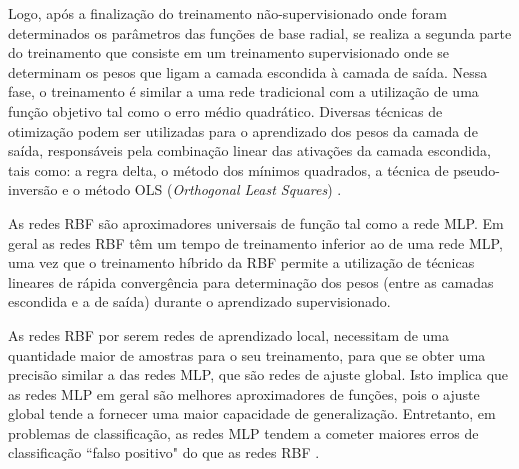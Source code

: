 Logo, após a finalização do treinamento não-supervisionado onde foram determinados os parâmetros das funções de base radial, se realiza a segunda parte do treinamento que consiste em um treinamento supervisionado onde se determinam os pesos que ligam a camada escondida à camada de saída. Nessa fase, o treinamento é similar a uma rede tradicional com a utilização de uma função objetivo tal como o erro médio quadrático. Diversas técnicas de otimização podem ser utilizadas para o aprendizado dos pesos da camada de saída, responsáveis pela combinação linear das ativações da camada escondida, tais como: a regra delta, o método dos mínimos quadrados, a técnica de pseudo-inversão e o método OLS (\textit{Orthogonal Least Squares}) \cite{chen1991orthogonal}.

As redes RBF são aproximadores universais de função tal como a rede MLP. Em geral as redes RBF têm um tempo de treinamento inferior ao de uma rede MLP, uma vez que o treinamento híbrido da RBF permite a utilização de técnicas lineares de rápida convergência para determinação dos pesos (entre as camadas escondida e a de saída) durante o aprendizado supervisionado.

As redes RBF por serem redes de aprendizado local, necessitam de uma quantidade maior de amostras para o seu treinamento, para que se obter uma precisão similar a das redes MLP, que são redes de ajuste global. Isto implica que as redes MLP em geral são melhores aproximadores de funções, pois o ajuste global tende a fornecer uma maior capacidade de generalização. Entretanto, em problemas de classificação, as redes MLP tendem a cometer maiores erros de classificação ``falso positivo" do que as redes RBF \cite{valenca1995fundamentos}.

